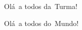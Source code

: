 \def\cmd{Ol\'a}
\def\ocmd#1#2{a todos #1\ #2}
\def\comando#1#2{\cmd\ \ocmd{#1}{#2}!}

\comando{da}{Turma}\par
\comando{do}{Mundo}
\bye
